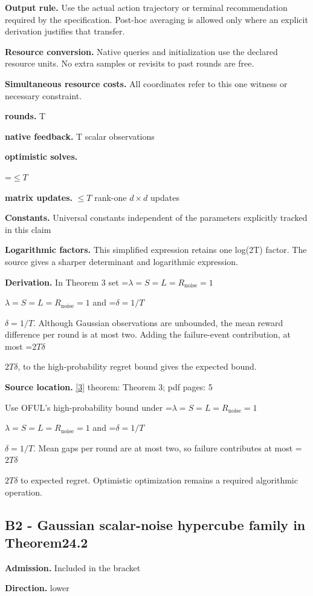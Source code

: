 \documentclass[10pt,a4paper]{article}
\newcommand{\AtlasMath}[1]{\par\begingroup\centering\setbox0=\hbox{$\displaystyle #1$}\ifdim\wd0>1.4\linewidth\typeout{ATLAS WIDE FORMULA: \the\wd0}\fi\ifdim\wd0>\linewidth\resizebox{\linewidth}{!}{\box0}\else\box0\fi\par\endgroup}
\newcommand{\AtlasInlineMath}[1]{\begingroup\setbox0=\hbox{$#1$}\ifdim\wd0>.4\linewidth\endgroup\AtlasMath{#1}\else\endgroup$#1$\fi}
\begin{document}
\textbf{Output rule.} Use the actual action trajectory or terminal recommendation required by the specification. Post-hoc averaging is allowed only where an explicit derivation justifies that transfer.

\textbf{Resource conversion.} Native queries and initialization use the declared resource units. No extra samples or revisits to past rounds are free.

\textbf{Simultaneous resource costs.} All coordinates refer to this one witness or necessary constraint.

\textbf{rounds.} T

\textbf{native feedback.} T scalar observations

\textbf{optimistic solves.}

\AtlasMath{\le T}
\textbf{matrix updates.} $\le T$ rank-one $d\times d$ updates

\textbf{Constants.} Universal constants independent of the parameters explicitly tracked in this claim

\textbf{Logarithmic factors.} This simplified expression retains one log(2T) factor. The source gives a sharper determinant and logarithmic expression.

\textbf{Derivation.} In Theorem 3 set \AtlasInlineMath{\lambda=S=L=R_{\mathrm{noise}}=1} and \AtlasInlineMath{\delta=1/T}. Although Gaussian observations are unbounded, the mean reward difference per round is at most two. Adding the failure-event contribution, at most \AtlasInlineMath{2T\delta}, to the high-probability regret bound gives the expected bound.

\textbf{Source location.} \href{https://proceedings.neurips.cc/paper/2011/file/e1d5be1c7f2f456670de3d53c7b54f4a-Paper.pdf}{[3]} theorem: Theorem 3; pdf pages: 5

Use OFUL's high-probability bound under \AtlasInlineMath{\lambda=S=L=R_{\mathrm{noise}}=1} and \AtlasInlineMath{\delta=1/T}. Mean gaps per round are at most two, so failure contributes at most \AtlasInlineMath{2T\delta} to expected regret. Optimistic optimization remains a required algorithmic operation.

\subsection{B2 - Gaussian scalar-noise hypercube family in Theorem24.2}
\textbf{Admission.} Included in the bracket

\textbf{Direction.} lower
\end{document}

